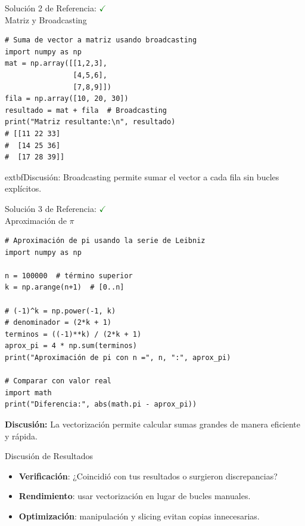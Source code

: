 \documentclass[10pt]{beamer}
\begin{document}
\begin{frame}[fragile]{Solución 2 de Referencia: \hfill \textcolor{green}{$\checkmark$} \\ Matriz y Broadcasting}
\begin{verbatim}
# Suma de vector a matriz usando broadcasting
import numpy as np
mat = np.array([[1,2,3],
                [4,5,6],
                [7,8,9]])
fila = np.array([10, 20, 30])
resultado = mat + fila  # Broadcasting
print("Matriz resultante:\n", resultado)
# [[11 22 33]
#  [14 25 36]
#  [17 28 39]]
\end{verbatim}
	extbf{Discusión:} Broadcasting permite sumar el vector a cada fila sin bucles explícitos.
\end{frame}

\begin{frame}[fragile]{Solución 3 de Referencia: \hfill \textcolor{green}{$\checkmark$} \\ Aproximación de $\pi$}
\begin{verbatim}
# Aproximación de pi usando la serie de Leibniz
import numpy as np

n = 100000  # término superior
k = np.arange(n+1)  # [0..n]

# (-1)^k = np.power(-1, k)
# denominador = (2*k + 1)
terminos = ((-1)**k) / (2*k + 1)
aprox_pi = 4 * np.sum(terminos)
print("Aproximación de pi con n =", n, ":", aprox_pi)

# Comparar con valor real
import math
print("Diferencia:", abs(math.pi - aprox_pi))
\end{verbatim}
	\textbf{Discusión:} La vectorización permite calcular sumas grandes de manera eficiente y rápida.
\end{frame}

\begin{frame}{Discusión de Resultados}
  \begin{itemize}
    \item \textbf{Verificación}: ¿Coincidió con tus resultados o surgieron discrepancias?
    \item \textbf{Rendimiento}: usar vectorización en lugar de bucles manuales.
    \item \textbf{Optimización}: manipulación y slicing evitan copias innecesarias.
  \end{itemize}
\end{frame}
\end{document}
